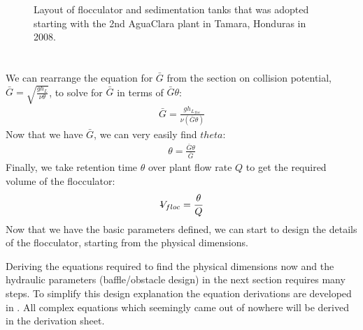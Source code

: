 \documentclass[letterpaper,10pt,english]{sphinxmanual}
\let\sphinxpxdimen\pdfpxdimen\else\newdimen\sphinxpxdimen
\begin{document}
\begin{figure}[htbp]
\centering
\capstart

\noindent\sphinxincludegraphics[width=600\sphinxpxdimen]{{Physical_design_criteria}.jpg}
\caption{Layout of flocculator and sedimentation tanks that was adopted starting with the 2nd AguaClara plant in Tamara, Honduras in 2008.}\label{\detokenize{Flocculation/Floc_Design:id15}}\label{\detokenize{Flocculation/Floc_Design:figure-physical-design-criteria-floc}}\end{figure}


\section{}
\label{\detokenize{Flocculation/Floc_Design:find}}
We can rearrange the equation for \(\bar G\) from the section on collision potential, \(\bar G = \sqrt{\frac{g h_L}{\nu \theta}}\), to solve for \(\bar G\) in terms of \(\bar G \theta\):
\begin{equation}\label{equation:Flocculation/Floc_Design:Flocculation/Floc_Design:15}
\begin{split}\bar G = \frac{g h_{L_{floc}}}{\nu (\bar G \theta)}\end{split}
\end{equation}
Now that we have \(\bar G\), we can very easily find \(theta\):
\begin{equation}\label{equation:Flocculation/Floc_Design:Flocculation/Floc_Design:16}
\begin{split}\theta = \frac{\bar G \theta}{\bar G}\end{split}
\end{equation}
Finally, we take retention time \(\theta\) over plant flow rate \(Q\) to get the required volume of the flocculator:
\begin{equation}\label{equation:Flocculation/Floc_Design:Flocculation/Floc_Design:17}
\begin{split}\rlap{-} V_{floc} = \frac{\theta}{Q}\end{split}
\end{equation}
Now that we have the basic parameters defined, we can start to design the details of the flocculator, starting from the physical dimensions.

Deriving the equations required to find the physical dimensions now and the hydraulic parameters (baffle/obstacle design) in the next section requires many steps. To simplify this design explanation the equation derivations are developed in {\hyperref[\detokenize{Review/Review_Fluid_Mechanics_Derivations:title-review-fluid-mechanics-derivations}]{}}. All complex equations which seemingly came out of nowhere will be derived in the derivation sheet.
\end{document}
